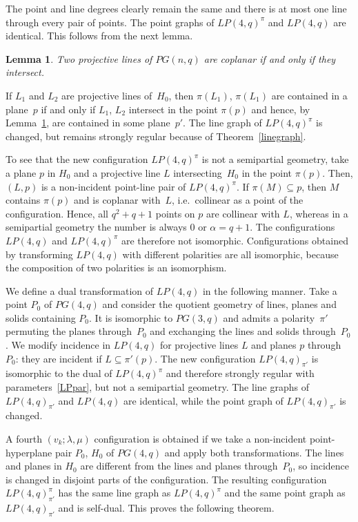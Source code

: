 \documentclass[12pt, reqno]{amsart}
\newtheorem{lemma}[theorem]{Lemma}
\begin{document}
The point and line degrees clearly remain the same and there is at most one line through every pair of
points. The point graphs of $LP(4,q)^\pi$ and $LP(4,q)$ are identical. This follows from the next lemma.

\begin{lemma}\label{coplanarity}
Two projective lines of $PG(n,q)$ are coplanar if and only if they intersect.
\end{lemma}

If $L_1$ and $L_2$ are projective lines of~$H_0$, then $\pi(L_1)$, $\pi(L_1)$ are contained in a
plane~$p$ if and only if $L_1$, $L_2$ intersect in the point $\pi(p)$ and hence, by Lemma~\ref{coplanarity},
are contained in some plane~$p'$. The line graph of $LP(4,q)^\pi$ is changed, but remains strongly regular because
of Theorem~\ref{linegraph}.

To see that the new configuration $LP(4,q)^\pi$ is not a semipartial geometry, take a plane $p$ in $H_0$
and a projective line $L$ intersecting~$H_0$ in the point $\pi(p)$. Then, $(L,p)$ is
a non-incident point-line pair of $LP(4,q)^\pi$. If $\pi(M)\subseteq p$, then $M$ contains $\pi(p)$ and is
coplanar with~$L$, i.e.\ collinear as a point of the configuration. Hence, all $q^2+q+1$ points on $p$ are
collinear with $L$, whereas in a semipartial geometry the number is always $0$ or $\alpha=q+1$. The configurations
$LP(4,q)$ and $LP(4,q)^\pi$ are therefore not isomorphic. Configurations obtained by transforming $LP(4,q)$
with different polarities are all isomorphic, because the composition of two polarities is an isomorphism.

We define a dual transformation of $LP(4,q)$ in the following manner. Take a point $P_0$ of $PG(4,q)$ and
consider the quotient geometry of lines, planes and solids containing $P_0$. It is isomorphic to $PG(3,q)$
and admits a polarity~$\pi'$ permuting the planes through~$P_0$ and exchanging the lines and solids
through~$P_0$. We modify incidence in $LP(4,q)$ for projective lines $L$ and planes $p$ through $P_0$:
they are incident if $L\subseteq \pi'(p)$. The new configuration $LP(4,q)_{\pi'}$ is isomorphic to the
dual of $LP(4,q)^\pi$ and therefore strongly regular with
parameters~\eqref{LPpar}, but not a semipartial geometry. The line graphs of $LP(4,q)_{\pi'}$ and $LP(4,q)$
are identical, while the point graph of $LP(4,q)_{\pi'}$ is changed.

A fourth $(v_k;\lambda,\mu)$ configuration is obtained if we take a non-incident point-hyperplane pair
$P_0$, $H_0$ of $PG(4,q)$ and apply both transformations. The lines and planes in $H_0$ are different from
the lines and planes through~$P_0$, so incidence is changed in disjoint parts of the configuration. The resulting
configuration $LP(4,q)_{\pi'}^\pi$ has the same line graph as $LP(4,q)^\pi$ and the same point graph as
$LP(4,q)_{\pi'}$ and is self-dual. This proves the following theorem.
\end{document}
